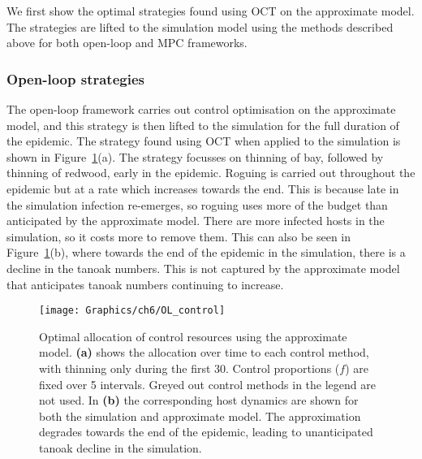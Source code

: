 We first show the optimal strategies found using OCT on the approximate model. The strategies are lifted to the simulation model using the methods described above for both open-loop and MPC frameworks.

\subsubsection{Open-loop strategies}\label{sec:ch6:open_loop}

The open-loop framework carries out control optimisation on the approximate model, and this strategy is then lifted to the simulation for the full duration of the epidemic. The strategy found using OCT when applied to the simulation is shown in Figure~\ref{fig:ch6:ol_strat}(a). The strategy focusses on thinning of bay, followed by thinning of redwood, early in the epidemic. Roguing is carried out throughout the epidemic but at a rate which increases towards the end. This is because late in the simulation infection re-emerges, so roguing uses more of the budget than anticipated by the approximate model. There are more infected hosts in the simulation, so it costs more to remove them. This can also be seen in Figure~\ref{fig:ch6:ol_strat}(b), where towards the end of the epidemic in the simulation, there is a decline in the tanoak numbers. This is not captured by the approximate model that anticipates tanoak numbers continuing to increase.

\begin{figure}[!t]
    \begin{center}
        \texttt{[image: Graphics/ch6/OL\_control]}
        \caption[Open-loop control strategy]{Optimal allocation of control resources using the approximate model. \textbf{(a)} shows the allocation over time to each control method, with thinning only during the first \SI{30}{\years{}}. Control proportions ($f$) are fixed over \SI{5}{\year} intervals. Greyed out control methods in the legend are not used. In \textbf{(b)} the corresponding host dynamics are shown for both the simulation and approximate model. The approximation degrades towards the end of the epidemic, leading to unanticipated tanoak decline in the simulation.\label{fig:ch6:ol_strat}}
    \end{center}
\end{figure}

